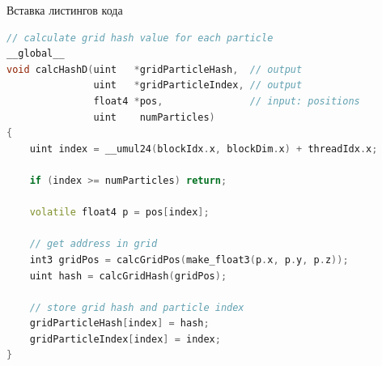 \documentclass{YourPres}
\begin{document}
  \begin{frame}[fragile]{Вставка листингов кода}\vspace*{-0.25cm}
    \begin{minipage}[h]{0.7\linewidth}
      \begin{lstlisting}[language=C++,style=CUDA,label=lst1,caption=CUDA Samples -- 5]
// calculate grid hash value for each particle
__global__
void calcHashD(uint   *gridParticleHash,  // output
               uint   *gridParticleIndex, // output
               float4 *pos,               // input: positions
               uint    numParticles)
{
    uint index = __umul24(blockIdx.x, blockDim.x) + threadIdx.x;

    if (index >= numParticles) return;

    volatile float4 p = pos[index];

    // get address in grid
    int3 gridPos = calcGridPos(make_float3(p.x, p.y, p.z));
    uint hash = calcGridHash(gridPos);

    // store grid hash and particle index
    gridParticleHash[index] = hash;
    gridParticleIndex[index] = index;
}
      \end{lstlisting}
    \end{minipage}\hspace*{0.3cm}
    \begin{minipage}[h]{0.27\linewidth}\vskip4pt
       
    \end{minipage}
  \end{frame}
\end{document}
